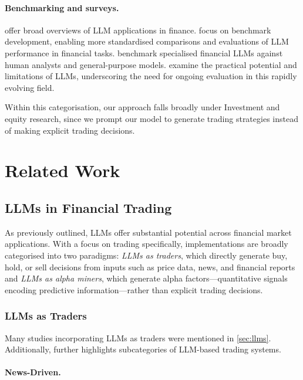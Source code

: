 \documentclass[conference]{IEEEtran}
\begin{document}
\paragraph{Benchmarking and surveys.}
\cite{zhao2024llmsurvey,nie2024survey,ding2024survey}
offer broad overviews of LLM applications in finance.
\cite{li2024investorbench,mateega2025} focus on benchmark development, enabling
more standardised comparisons and evaluations of LLM performance in financial tasks.
\cite{abdelsamie2024} benchmark specialised financial LLMs against human analysts and
general-purpose models.
\cite{bi2024,chiang2025} examine the practical potential and limitations of LLMs,
underscoring the need for ongoing evaluation in this rapidly evolving field.

Within this categorisation, our approach falls broadly under Investment and equity research, since we prompt our model to generate trading strategies instead of making explicit trading decisions.

\section{Related Work}
\label{ch:related}

\subsection{LLMs in Financial Trading}
\label{sec:llm-trading}

As previously outlined, LLMs offer substantial potential across financial market applications. With
a focus on trading specifically, implementations are broadly categorised \cite{ding2024survey}
into two paradigms: \emph{LLMs as traders}, which directly generate buy, hold, or sell
decisions from inputs such as price data, news, and financial reports and \emph{LLMs as alpha miners}, which generate alpha
factors---quantitative signals encoding predictive information---rather than explicit trading decisions.

\subsubsection{LLMs as Traders}
\label{sec:llm-traders}
Many studies incorporating LLMs as traders were mentioned in \cref{sec:llms}. Additionally, \cite{ding2024survey} further highlights
subcategories of LLM-based trading systems.

\paragraph{News-Driven.}
\end{document}
